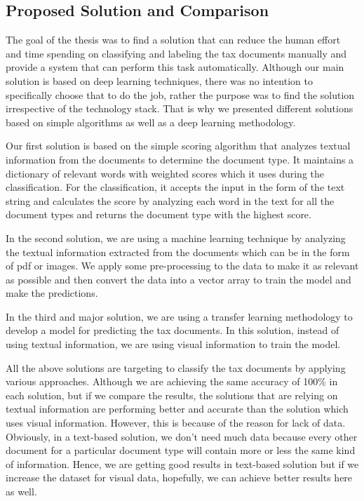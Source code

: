 \subsection{Proposed Solution and Comparison}
The goal of the thesis was to find a solution that can reduce the human effort and time spending on classifying and labeling the tax documents manually and provide a system that can perform this task automatically. Although our main solution is based on deep learning techniques, there was no intention to specifically choose that to do the job, rather the purpose was to find the solution irrespective of the technology stack. That is why we presented different solutions based on simple algorithms as well as a deep learning methodology.
\newline
\par
Our first solution is based on the simple scoring algorithm that analyzes textual information from the documents to determine the document type. It maintains a dictionary of relevant words with weighted scores which it uses during the classification. For the classification, it accepts the input in the form of the text string and calculates the score by analyzing each word in the text for all the document types and returns the document type with the highest score. 
\newline
\par
In the second solution, we are using a machine learning technique by analyzing the textual information extracted from the documents which can be in the form of pdf or images. We apply some pre-processing to the data to make it as relevant as possible and then convert the data into a vector array to train the model and make the predictions.
\newline
\par
In the third and major solution, we are using a transfer learning methodology to develop a model for predicting the tax documents. In this solution, instead of using textual information, we are using visual information to train the model.
\newline
\par
All the above solutions are targeting to classify the tax documents by applying various approaches. Although we are achieving the same accuracy of 100\% in each solution, but if we compare the results, the solutions that are relying on textual information are performing better and accurate than the solution which uses visual information. However, this is because of the reason for lack of data. Obviously, in a text-based solution, we don't need much data because every other document for a particular document type will contain more or less the same kind of information. Hence, we are getting good results in text-based solution but if we increase the dataset for visual data, hopefully, we can achieve better results here as well.
